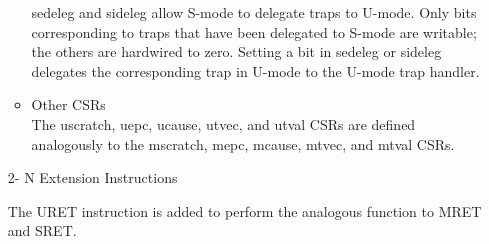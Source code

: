 \documentclass[../main.tex]{subfiles}
\begin{document}
\begin{itemize}
\begin{itemize}
            sedeleg and sideleg allow S-mode to delegate traps to U-mode. Only bits corresponding to traps
            that have been delegated to S-mode are writable; the others are hardwired to zero. Setting a bit
            in sedeleg or sideleg delegates the corresponding trap in U-mode to the U-mode trap handler.\\
            
            \item Other CSRs\\
            The uscratch, uepc, ucause, utvec, and utval CSRs are defined analogously to the mscratch,
            mepc, mcause, mtvec, and mtval CSRs.\\
        \end{itemize}
    \item[2- ]N Extension Instructions
        \begin{itemize}
        The URET instruction is added to perform the analogous function to MRET and SRET.
        \end{itemize}
    \end{itemize}
	
\end{document}
